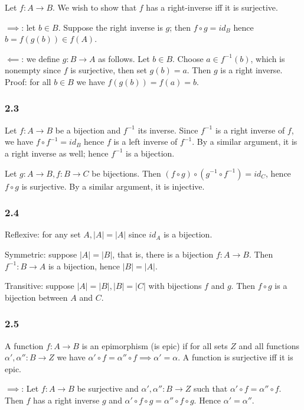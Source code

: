 \documentclass{article}
\begin{document}
Let $f: A \to B$. We wish to show that $f$ has a right-inverse iff it is surjective.

$\implies$: let $b \in B$. Suppose the right inverse is $g$; then $f \circ g = id_B$ hence $b = f(g(b)) \in f(A)$.

$\impliedby$: we define $g: B \to A$ as follows. Let $b \in B$. Choose $a \in f^{-1}(b)$, which is nonempty since $f$ is surjective, then set $g(b) = a$. Then $g$ is a right inverse. Proof: for all $b \in B$ we have $f(g(b)) = f(a) = b$.

\subsubsection*{2.3}

Let $f: A \to B$ be a bijection and $f^{-1}$ its inverse. Since $f^{-1}$ is a right inverse of $f$, we have $f \circ f^{-1} = id_B$ hence $f$ is a left inverse of $f^{-1}$. By a similar argument, it is a right inverse as well; hence $f^{-1}$ is a bijection.

Let $g: A \to B, f: B \to C$ be bijections. Then $(f \circ g) \circ (g^{-1} \circ f^{-1}) = id_C$, hence $f \circ g$ is surjective. By a similar argument, it is injective.

\subsubsection*{2.4}

Reflexive: for any set $A, |A| = |A|$ since $id_A$ is a bijection.

Symmetric: suppose $|A| = |B|$, that is, there is a bijection $f: A \to B$. Then $f^{-1}: B \to A$ is a bijection, hence $|B| = |A|$.

Transitive: suppose $|A| = |B|, |B| = |C|$ with bijections $f$ and $g$. Then $f \circ g$ is a bijection between $A$ and $C$.

\subsubsection*{2.5}

A function $f: A \to B$ is an epimorphism (is epic) if for all sets $Z$ and all functions $\alpha', \alpha'': B \to Z$ we have $\alpha' \circ f = \alpha'' \circ f \implies \alpha' = \alpha$. A function is surjective iff it is epic.

$\implies$: Let $f: A \to B$ be surjective and $\alpha', \alpha'': B \to Z$ such that $\alpha' \circ f = \alpha'' \circ f$. Then $f$ has a right inverse $g$ and $\alpha' \circ f \circ g = \alpha'' \circ f \circ g$. Hence $\alpha' = \alpha''$.
\end{document}
